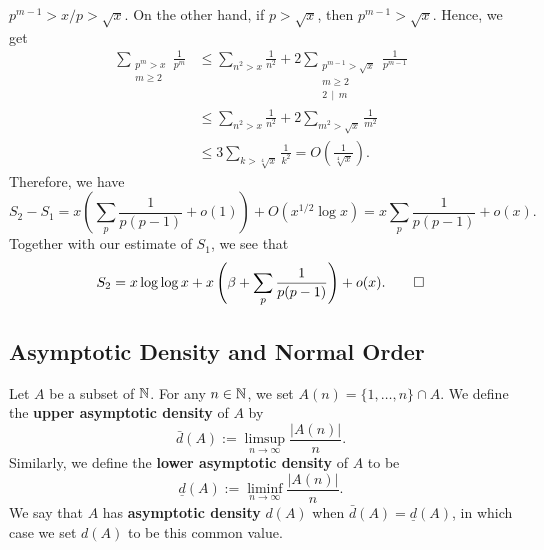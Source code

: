 \begin{pf}
    $p^{m-1} > x/p > \sqrt{x}$. On the other hand, if $p > \sqrt{x}$, then 
    $p^{m-1} > \sqrt{x}$. Hence, we get 
    \begin{align*} 
        \sum_{\substack{p^m > x \\ m \geq 2}} \frac{1}{p^m} 
        &\leq \sum_{n^2 > x} \frac{1}{n^2} + 2 \sum_{\substack{p^{m-1} > \sqrt{x}
        \\ m \geq 2 \\ 2\,\mid\,m}} \frac{1}{p^{m-1}} \\
        &\leq \sum_{n^2 > x} \frac{1}{n^2} + 2 \sum_{m^2 > \sqrt{x}} \frac{1}{m^2} \\ 
        &\leq 3 \sum_{k > \sqrt[4]{x}} \frac{1}{k^2} = O\left( \frac{1}{\sqrt[4]{x}} \right). 
    \end{align*}
    Therefore, we have 
    \[ S_2 - S_1 = x \left( \sum_p \frac{1}{p(p-1)} + o(1) \right) 
    + O(x^{1/2} \log x) = x \sum_p \frac{1}{p(p-1)} + o(x). \] 
    Together with our estimate of $S_1$, we see that 
    \[ S_2 = x\log\log x + x \left( \beta + \sum_p \frac{1}{p(p-1)} \right) 
    + o(x). \qedhere \] 
\end{pf}

\subsection{Asymptotic Density and Normal Order}\label{subsec:4.3} 

\begin{defn}\label{def:4.5}
    Let $A$ be a subset of $\mathbb{N}$. For any $n \in \mathbb{N}$, we set $A(n) 
    = \{1, \dots, n\} \cap A$. We define the {\bf upper asymptotic density}
    of $A$ by 
    \[ \bar{d}(A) := \limsup_{n\to\infty} \frac{|A(n)|}{n}. \] 
    Similarly, we define the {\bf lower asymptotic density} of $A$ to be 
    \[ \underline{d}(A) := \liminf_{n\to\infty} \frac{|A(n)|}{n}. \] 
    We say that $A$ has {\bf asymptotic density} $d(A)$ when 
    $\bar{d}(A) = \underline{d}(A)$, in which case we set $d(A)$ to be 
    this common value. 
\end{defn}

